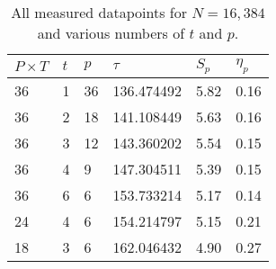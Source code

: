 \begin{table}[H]
  \centering
  \caption{All measured datapoints for $N=16,384$ and various numbers of $t$ and $p$.}
  \label{tab:speedup_all_data}
  \begin{tabularx}{0.9\textwidth}{XXXX|XX}
    \toprule
    $P\times T$ & $t$ & $p$ & $\tau$ & $S_p$ & $\eta_p$ \\
    \midrule
    36   &  1   & 36    &  136.474492 & 5.82  & 0.16\\
    36   &  2   & 18    &  141.108449 & 5.63  & 0.16\\
    36   &  3   & 12    &  143.360202 & 5.54  & 0.15\\
    36   &  4   & 9     &  147.304511 & 5.39  & 0.15\\
    36   &  6   & 6     &  153.733214 & 5.17  & 0.14\\
    24   &  4   & 6     &  154.214797 & 5.15  & 0.21\\
    18   &  3   & 6     &  162.046432 & 4.90  & 0.27\\
    \bottomrule
  \end{tabularx}
\end{table}

